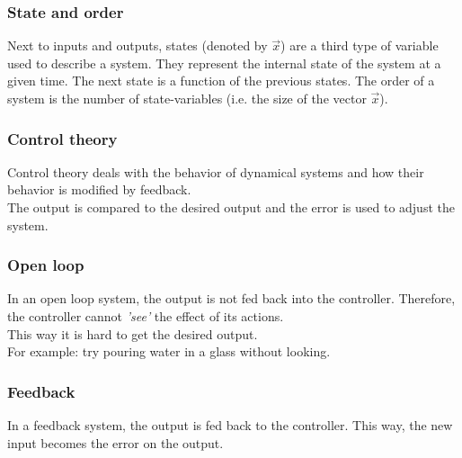 \documentclass{beamer}
\begin{document}

\begin{frame}
\frametitle{State and order}
Next to inputs and outputs, states (denoted by $\overrightarrow{x}$) are a third type of variable used to describe a system. They represent the internal state of the system at a given time. The next state is a function of the previous states.
The order of a system is the number of state-variables (i.e. the size of the vector $\overrightarrow{x}$).
\end{frame}


\begin{frame}
\frametitle{Control theory}
Control theory deals with the behavior of dynamical systems and how their behavior is modified by feedback.\\
The output is compared to the desired output and the error is used to adjust the system. 
\end{frame}


\begin{frame}
\frametitle{Open loop}
In an open loop system, the output is not fed back into the controller. Therefore, the controller cannot \textit{'see'} the effect of its actions. \\
This way it is hard to get the desired output.\\
\bigskip
For example: try pouring water in a glass without looking.
\end{frame}


\begin{frame}
\frametitle{Feedback}
In a feedback system, the output is fed back to the controller. This way, the new input becomes the error on the output. 
\end{frame}

\end{document}
